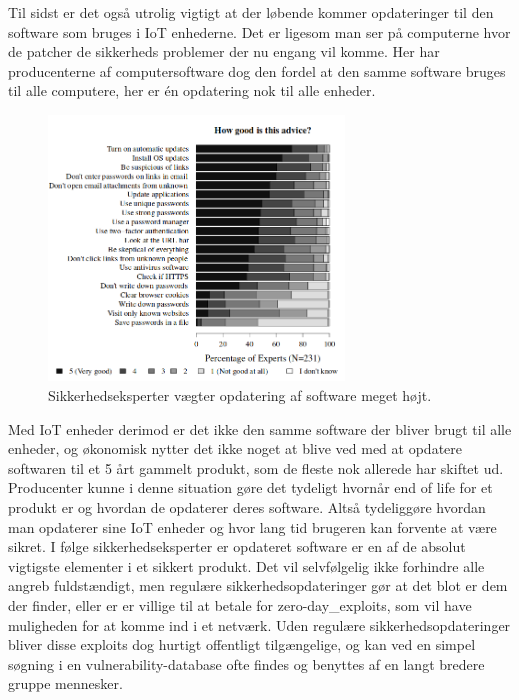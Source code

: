     Til sidst er det også utrolig vigtigt at der løbende kommer opdateringer til den software som bruges i IoT enhederne. Det er ligesom man ser på computerne hvor de patcher de sikkerheds problemer der nu engang vil komme. Her har producenterne af computersoftware dog den fordel at den samme software bruges til alle computere, her er én opdatering nok til alle enheder. \\
    \begin{figure}[H]
        \centering
            \includegraphics[width=0.7\textwidth]{figures/importance_of_updates.png}
        \caption{Sikkerhedseksperter vægter opdatering af software meget højt.\autocite{soups2015}}\label{fig:updates}
    \end{figure}
    Med IoT enheder derimod er det ikke den samme software der bliver brugt til alle enheder, og økonomisk nytter det ikke noget at blive ved med at opdatere softwaren til et 5 årt gammelt produkt, som de fleste nok allerede har skiftet ud.
    Producenter kunne i denne situation gøre det tydeligt hvornår end of life for et produkt er og hvordan de opdaterer deres software. Altså tydeliggøre hvordan man opdaterer sine IoT enheder og hvor lang tid brugeren kan forvente at være sikret. I følge sikkerhedseksperter er opdateret software er en af de absolut vigtigste elementer i et sikkert produkt. \autocite{soups2015}
    Det vil selvfølgelig ikke forhindre alle angreb fuldstændigt, men regulære sikkerhedsopdateringer gør at det blot er dem der finder, eller er er villige til at betale for \glspl{zero-day_exploit}, som vil have muligheden for at komme ind i et netværk. Uden regulære sikkerhedsopdateringer bliver disse exploits dog hurtigt offentligt tilgængelige, og kan ved en simpel søgning i en \gls{vulnerability-database} ofte findes og benyttes af en langt bredere gruppe mennesker.\\
